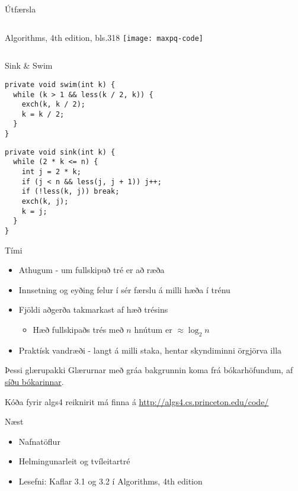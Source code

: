\documentclass{beamer}
\begin{document}
\headandfoot

\begin{frame}{Útfærsla}
	\begin{columns}
		Algorithms, 4th edition, bls.318
		\texttt{[image: maxpq-code]}
	\end{columns}
\end{frame}

\headonly

\begin{frame}[fragile]{Sink \& Swim}

		\begin{verbatim}
private void swim(int k) {
  while (k > 1 && less(k / 2, k)) {
    exch(k, k / 2);
    k = k / 2;
  }
}
		\end{verbatim}

		
		\begin{verbatim}
private void sink(int k) {
  while (2 * k <= n) {
    int j = 2 * k;
    if (j < n && less(j, j + 1)) j++;
    if (!less(k, j)) break;
    exch(k, j);
    k = j;
  }
}
		\end{verbatim}
		
\end{frame}

\headandfoot

\begin{frame}{Tími}
	\begin{itemize}
		\item Athugum - um fullskipuð tré er að ræða
		\item Innsetning og eyðing felur í sér færslu á milli hæða í trénu
		\item Fjöldi aðgerða takmarkast af hæð trésins
		      \begin{itemize}
			      \item Hæð fullskipaðs trés með $n$ hnútum er $\approx \log_2 n $
		      \end{itemize}
		\item Praktísk vandræði - langt á milli staka, hentar skyndiminni örgjörva illa
	\end{itemize}
\end{frame}

\begin{frame}{Þessi glærupakki}
	Glærurnar með gráa bakgrunnin koma frá bókarhöfundum, af \href{http://algs4.cs.princeton.edu/lectures/}{síðu bókarinnar}.

	Kóða fyrir algs4 reiknirit má finna á \url{http://algs4.cs.princeton.edu/code/}
\end{frame}

\begin{frame}{Næst}
	\begin{itemize}
		\item Nafnatöflur
		\item Helmingunarleit og tvíleitartré
		\item Lesefni: Kaflar 3.1 og 3.2 í Algorithms, 4th edition
	\end{itemize}
\end{frame}
\end{document}
